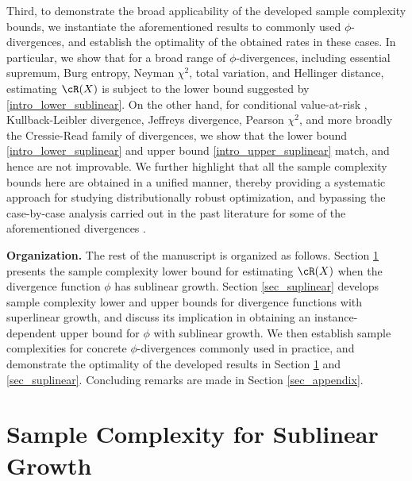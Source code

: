 \documentclass[9pt]{article} %
\numberwithin{equation}{section}
\begin{document}
Third, to demonstrate the broad applicability of the developed sample complexity bounds, we instantiate the aforementioned results to commonly used $\phi$-divergences, and establish the optimality of the obtained rates in these cases.
In particular, we show that for a broad range of $\phi$-divergences, including essential supremum, Burg entropy, Neyman $\chi^2$, total variation, and Hellinger distance, estimating $\cR(X)$ is subject to the lower bound suggested by \eqref{intro_lower_sublinear}. 
On the other hand, for conditional value-at-risk \cite{rockafellar2000optimization}, Kullback-Leibler divergence, Jeffreys divergence, Pearson $\chi^2$, and more broadly the Cressie-Read family of divergences, we show that the lower bound \eqref{intro_lower_suplinear} and upper bound \eqref{intro_upper_suplinear} match, and hence are not improvable. 
We further highlight that all the sample complexity bounds here are obtained in a unified manner, thereby providing a systematic approach for studying distributionally robust optimization, and bypassing the case-by-case analysis carried out in the past literature for some of the aforementioned divergences \cite{duchi2021learning,levy2020large,xu2023improved, shi2024distributionally,wang2024sample}.



{\bf Organization.}
The rest of the manuscript is organized as follows. 
Section \ref{sec_sublinear} presents the sample complexity lower bound for estimating $\cR(X)$ when the divergence function $\phi$ has sublinear growth. 
Section \ref{sec_suplinear} develops sample complexity lower and upper bounds for divergence functions with superlinear growth, and discuss  its implication in obtaining an instance-dependent upper bound for $\phi$ with sublinear growth. 
We then establish sample complexities for concrete $\phi$-divergences commonly used in practice, and demonstrate the optimality of the developed results in Section \ref{sec_sublinear} and \ref{sec_suplinear}. 
Concluding remarks are made in Section \ref{sec_appendix}.




















\section{Sample Complexity for Sublinear Growth}\label{sec_sublinear}
\end{document}
